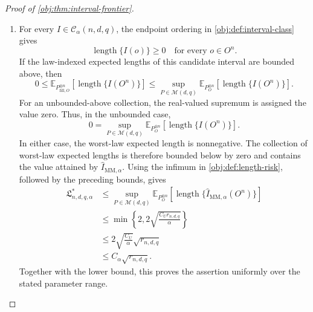 \documentclass[11pt]{article}
\begin{document}
\begin{proof}[Proof of \cref{obj:thm:interval-frontier}]
\begin{enumerate}
\item For every \(I\in\mathcal C_\alpha(n,d,q)\), the endpoint ordering in \cref{obj:def:interval-class} gives
\[
\operatorname{length}\{I(o)\}\ge0
\quad\text{for every }o\in O^n.
\]
If the law-indexed expected lengths of this candidate interval are bounded above, then
\[
0\le
\mathbb E_{P_{\mathrm{fill},O}^{\otimes n}}
\left[\operatorname{length}\{I(O^n)\}\right]
\le
\sup_{P\in\mathcal M(d,q)}
\mathbb E_{P_O^{\otimes n}}
\left[\operatorname{length}\{I(O^n)\}\right].
\]
For an unbounded-above collection, the real-valued supremum is assigned the value zero. Thus, in the unbounded case,
\[
0=
\sup_{P\in\mathcal M(d,q)}
\mathbb E_{P_O^{\otimes n}}
\left[\operatorname{length}\{I(O^n)\}\right].
\]
In either case, the worst-law expected length is nonnegative. The collection of worst-law expected lengths is therefore bounded below by zero and contains the value attained by \(\widehat I_{\mathrm{MM},\alpha}\). Using the infimum in \cref{obj:def:length-risk}, followed by the preceding bounds, gives
\[
\begin{aligned}
\mathfrak L^*_{n,d,q,\alpha}
&\le
\sup_{P\in\mathcal M(d,q)}
\mathbb E_{P_O^{\otimes n}}
\left[
\operatorname{length}\{\widehat I_{\mathrm{MM},\alpha}(O^n)\}
\right]\\
&\le
\min\left\{2,2\sqrt{\frac{C_Ur_{n,d,q}}{\alpha}}\right\}\\
&\le
2\sqrt{\frac{C_U}{\alpha}}\sqrt{r_{n,d,q}}\\
&\le C_\alpha\sqrt{r_{n,d,q}}.
\end{aligned}
\]
Together with the lower bound, this proves the assertion uniformly over the stated parameter range.
\end{enumerate}
\end{proof}
\end{document}
